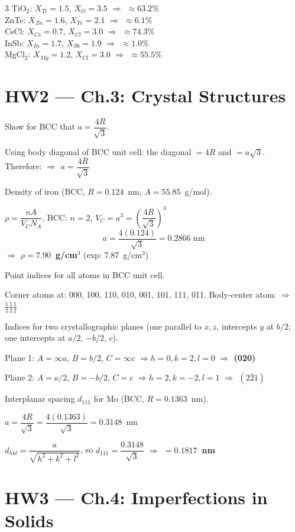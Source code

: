 \documentclass[8pt,letterpaper]{extarticle}
\newcommand{\prob}[1]{\smallskip\noindent{\footnotesize\bfseries\color{black!80} #1\quad}}
\newcommand{\soln}{\noindent{\footnotesize\itshape\color{blue!50!black}Sol: }}
\newcommand{\ans}[1]{{\footnotesize\bfseries\color{green!40!black}$\Rightarrow$ #1}}
\begin{document}
\begin{multicols*}{3}
TiO$_2$: $X_{Ti}=1.5$, $X_O=3.5$ \ans{$\approx63.2\%$}\\
ZnTe: $X_{Zn}=1.6$, $X_{Te}=2.1$ \ans{$\approx6.1\%$}\\
CsCl: $X_{Cs}=0.7$, $X_{Cl}=3.0$ \ans{$\approx74.3\%$}\\
InSb: $X_{In}=1.7$, $X_{Sb}=1.9$ \ans{$\approx1.0\%$}\\
MgCl$_2$: $X_{Mg}=1.2$, $X_{Cl}=3.0$ \ans{$\approx55.5\%$}

\section*{HW2 — Ch.3: Crystal Structures}

\prob{3.3} Show for BCC that $a = \dfrac{4R}{\sqrt{3}}$.

\soln Using body diagonal of BCC unit cell: the diagonal $= 4R$ and $= a\sqrt{3}$. Therefore:
\ans{$a = \dfrac{4R}{\sqrt{3}}$} \checkmark

\prob{3.7} Density of iron (BCC, $R=0.124$~nm, $A=55.85$~g/mol).

\soln $\rho = \dfrac{nA}{V_C N_A}$, BCC: $n=2$, $V_C = a^3 = \left(\dfrac{4R}{\sqrt{3}}\right)^3$
\[a = \dfrac{4(0.124)}{\sqrt{3}} = 0.2866\text{ nm}\]
\ans{$\rho = 7.90$~g/cm$^3$} (exp: 7.87~g/cm$^3$)

\prob{3.24} Point indices for all atoms in BCC unit cell.

\soln Corner atoms at: 000, 100, 110, 010, 001, 101, 111, 011. Body-center atom:
\ans{$\frac{1}{2}\frac{1}{2}\frac{1}{2}$}

\prob{3.43} Indices for two crystallographic planes (one parallel to $x,z$, intercepts $y$ at $b/2$; one intercepts at $a/2$, $-b/2$, $c$).

\soln Plane 1: $A=\infty a$, $B=b/2$, $C=\infty c$ $\Rightarrow h=0, k=2, l=0$ \ans{(020)}

Plane 2: $A=a/2$, $B=-b/2$, $C=c$ $\Rightarrow h=2, k=-2, l=1$ \ans{$(2\bar{2}1)$}

\prob{3.63} Interplanar spacing $d_{111}$ for Mo (BCC, $R=0.1363$~nm).

\soln $a = \dfrac{4R}{\sqrt{3}} = \dfrac{4(0.1363)}{\sqrt{3}} = 0.3148$~nm

$d_{hkl} = \dfrac{a}{\sqrt{h^2+k^2+l^2}}$, so $d_{111} = \dfrac{0.3148}{\sqrt{3}}$ \ans{$= 0.1817$~nm}

\section*{HW3 — Ch.4: Imperfections in Solids}


\end{multicols*}
\end{document}
